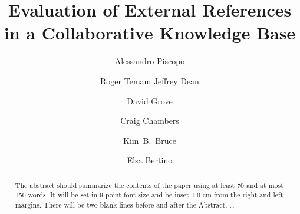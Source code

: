 \documentclass{llncs}
\begin{document}
%
\frontmatter          %
%
\pagestyle{headings}  %
%
%
\mainmatter              %
%
\title{Evaluation of External References in a Collaborative Knowledge Base}
%
%
\author{Alessandro Piscopo \and Roger Temam
Jeffrey Dean \and David Grove \and Craig Chambers \and Kim~B.~Bruce \and
Elsa Bertino}
%
%
%

\maketitle              %

\begin{abstract}
The abstract should summarize the contents of the paper
using at least 70 and at most 150 words. It will be set in 9-point
font size and be inset 1.0 cm from the right and left margins.
There will be two blank lines before and after the Abstract. \dots
{}
\end{abstract}
%
\end{document}
